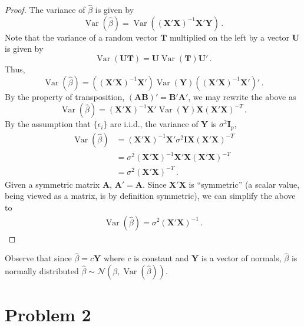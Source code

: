 \documentclass[
]{article}
\begin{document}
\begin{proof}
The variance of $\hat\beta$ is given by
\begin{equation}
   \operatorname{Var}(\hat\beta) = \operatorname{Var}\left((\mathbf{X}'\mathbf{X})^{-1} \mathbf{X}' \mathbf{Y}\right)\,.
\end{equation}
Note that the variance of a random vector $\mathbf{T}$ multiplied on the left
by a vector $\mathbf{U}$ is given by
\begin{equation}
   \operatorname{Var}(\mathbf{U} \mathbf{T}) = \mathbf{U} \operatorname{Var}(\mathbf{T}) \mathbf{U'}\,.
\end{equation}
Thus,
\begin{equation}
   \operatorname{Var}(\hat\beta) = \left((\mathbf{X}'\mathbf{X})^{-1} \mathbf{X}'\right)\operatorname{Var}(\mathbf{Y})\left((\mathbf{X}'\mathbf{X})^{-1} \mathbf{X}'\right)'\,.
\end{equation}
By the property of transposition, $(\mathbf{A}\mathbf{B})' = \mathbf{B}'\mathbf{A}'$, we may rewrite the above as
$$
   \operatorname{Var}(\hat\beta) = (\mathbf{X}'\mathbf{X})^{-1} \mathbf{X}' \operatorname{Var}(\mathbf{Y}) \mathbf{X} (\mathbf{X}'\mathbf{X})^{-T}\,.
$$
By the assumption that $\{\epsilon_i\}$ are i.i.d., the variance of $\mathbf{Y}$
is $\sigma^2 \mathbf{I}_{p}$,
\begin{align*}   
   \operatorname{Var}(\hat\beta) &= (\mathbf{X}'\mathbf{X})^{-1} \mathbf{X}'
   \sigma^2 \mathbf{I}
   \mathbf{X} (\mathbf{X}'\mathbf{X})^{-T}\\
   &= \sigma^2 (\mathbf{X}'\mathbf{X})^{-1} \mathbf{X}'
   \mathbf{X} (\mathbf{X}'\mathbf{X})^{-T}\\
   &= \sigma^2  (\mathbf{X}'\mathbf{X})^{-T}\,.
\end{align*}
Given a symmetric matrix $\mathbf{A}$, $\mathbf{A}' = \mathbf{A}$.
Since $\mathbf{X}' \mathbf{X}$ is ``symmetric'' (a scalar value, being viewed as
a matrix, is by definition symmetric), we can simplify the above to
\begin{align*}
   \operatorname{Var}(\hat\beta) = \sigma^2  (\mathbf{X}'\mathbf{X})^{-1}\,.
\end{align*}
\end{proof}

Observe that since \(\hat\beta = c \mathbf{Y}\) where \(c\) is constant
and \(\mathbf{Y}\) is a vector of normals, \(\hat\beta\) is normally
distributed
\(\hat\beta \sim \mathcal{N}(\beta, \operatorname{Var}(\hat\beta))\).

\hypertarget{problem-2}{%
\section{Problem 2}\label{problem-2}}
\end{document}
